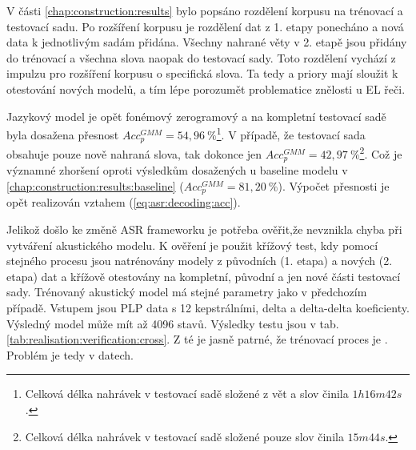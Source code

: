 V části \ref{chap:construction:results} bylo popsáno rozdělení korpusu na trénovací a testovací sadu. Po rozšíření korpusu je rozdělení dat z 1. etapy ponecháno a nová data k jednotlivým sadám přidána. Všechny nahrané věty v 2. etapě jsou přidány do trénovací a všechna slova naopak do testovací sady. Toto rozdělení vychází z impulzu pro rozšíření korpusu o specifická slova. Ta tedy a priory mají sloužit k otestování nových modelů, a tím lépe porozumět problematice znělosti u EL řeči.


Jazykový model je opět fonémový zerogramový a na kompletní testovací sadě byla dosažena přesnost $Acc_{p}^{GMM} = 54,96\ \%$\footnote{Celková délka nahrávek v testovací sadě složené z vět a slov činila $1h16m42s$.}. V případě, že testovací sada obsahuje pouze nově nahraná slova, tak dokonce jen $Acc_{p}^{GMM} = 42,97\ \%$\footnote{Celková délka nahrávek v testovací sadě složené pouze slov činila $15m44s$.}. Což je významné zhoršení oproti výsledkům dosažených u baseline modelu v \ref{chap:construction:results:baseline} ($Acc_{p}^{GMM} = 81,20\ \%$). Výpočet přesnosti je opět realizován vztahem (\ref{eq:asr:decoding:acc}).

Jelikož došlo ke změně ASR frameworku je potřeba ověřit,že nevznikla chyba při vytváření akustického modelu. K ověření je použit křížový test, kdy pomocí stejného procesu jsou natrénovány modely z původních (1. etapa) a nových (2. etapa) dat a křížově otestovány na kompletní, původní a jen nové části testovací sady. Trénovaný akustický model má stejné parametry jako v předchozím případě. Vstupem jsou PLP data s 12 kepstrálními, delta a delta-delta koeficienty. Výsledný model může mít až 4096 stavů. Výsledky testu jsou v tab. \ref{tab:realisation:verification:cross}. Z té je jasně patrné, že trénovací proces je . Problém je tedy v datech.


\begin{table}[htpb]
  \centering
  \def\arraystretch{1.5}
  \caption{Křížový test modelů natrénovaných a otestovaných na datech z 1. a 2. etapy.}
  \label{tab:realisation:verification:cross}
\end{table}

